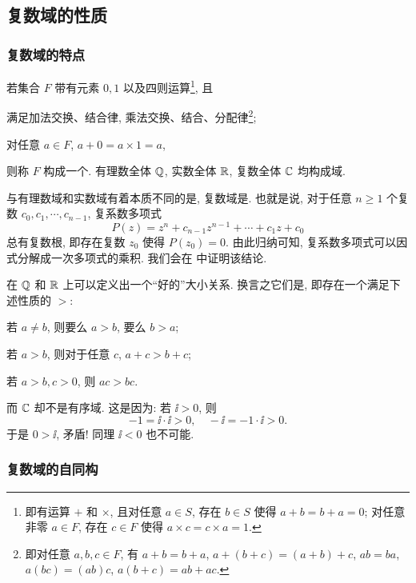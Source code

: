 \subsection{复数域的性质\optional}
\label{ssec:complex-field}

\subsubsection{复数域的特点}

若集合 $F$ 带有元素 $0,1$ 以及四则运算\footnote{%
  即有运算 $+$ 和 $\times$, 且对任意 $a\in S$, 存在 $b\in S$ 使得 $a+b=b+a=0$; 对任意非零 $a\in F$, 存在 $c\in F$ 使得 $a\times c=c\times a=1$.%
}, 且
\begin{enuma}
  \item 满足加法交换、结合律, 乘法交换、结合、分配律\footnote{即对任意 $a,b,c\in F$, 有 $a+b=b+a$, $a+(b+c)=(a+b)+c$, $ab=ba$, $a(bc)=(ab)c$, $a(b+c)=ab+ac$.};
  \item 对任意 $a\in F$, $a+0=a\times 1=a$,
\end{enuma}\parnoindent
则称 $F$ 构成一个.
有理数全体 ${\mathbb{Q}}$, 实数全体 ${\mathbb{R}}$, 复数全体 ${\mathbb{C}}$ 均构成域.

与有理数域和实数域有着本质不同的是, 复数域是.
也就是说, 对于任意 $n\ge 1$ 个复数 $c_0,c_1,\cdots,c_{n-1}$, 复系数多项式
\[
  P(z)=z^n+c_{n-1}z^{n-1}+\cdots+c_1z+c_0
\]
总有复数根, 即存在复数 $z_0$ 使得 $P(z_0)=0$.
由此归纳可知, 复系数多项式可以因式分解成一次多项式的乘积.
我们会在 中证明该结论.

在 ${\mathbb{Q}}$ 和 ${\mathbb{R}}$ 上可以定义出一个``好的''大小关系.
换言之它们是, 即存在一个满足下述性质的 $>$:
\begin{enuma}
  \item 若 $a\neq b$, 则要么 $a>b$, 要么 $b>a$;
  \item 若 $a>b$, 则对于任意 $c$, $a+c>b+c$;
  \item 若 $a>b,c>0$, 则 $ac>bc$.
\end{enuma}\parnoindent
而 \alert{${\mathbb{C}}$ 却不是有序域}.
这是因为: 若 $\ii>0$, 则
\[
  -1=\ii\cdot \ii>0,\quad -\ii=-1\cdot \ii>0.
\]
于是 $0>\ii$, 矛盾! 同理 $\ii<0$ 也不可能.


\subsubsection{复数域的自同构}
\label{sssec:complex-field-isomorphism}


